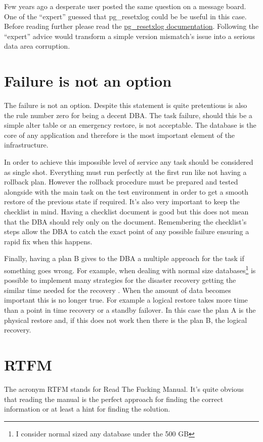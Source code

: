 Few years ago a desperate user posted the same question on a message board. One of the ``expert'' 
guessed that pg\_resetxlog could be be useful in this case. Before reading further please read the 
\href{http://www.postgresql.org/docs/9.3/static/app-pgresetxlog.html}{pg\_resetxlog documentation}. 
Following the ``expert'' advice would transform a simple version mismatch's issue into a serious 
data area corruption. 

\section{Failure is not an option}
The failure is not an option. Despite this statement is quite pretentious is also the rule number 
zero for being a decent DBA. The task failure, should this be a simple alter table or an emergency 
restore, is not acceptable. The database is the core of any application and therefore is the most important 
element of the infrastructure.\newline

In order to achieve this impossible level of service any task should be considered as single shot. 
Everything must run perfectly at the first run like not having a rollback plan. However the rollback 
procedure must be prepared and tested alongside with the main task on the test environment in order to get a 
smooth restore of the previous state if required. It's also very important to keep the checklist in mind. 
Having a checklist document is good but this does not mean that the DBA should rely only on the 
document. Remembering the checklist's steps allow the DBA to catch the exact point of any possible failure 
ensuring a rapid fix when this happens.\newline

Finally, having a plan B gives to the DBA a multiple approach for the task if something goes wrong. For 
example, when dealing with normal size databases\footnote{I consider normal sized any database under the 500 
GB} is possible to implement many strategies for the disaster recovery getting the similar time needed for 
the recovery . When the amount of data becomes important this is no longer true. For example a logical 
restore takes more time than a point in time recovery or a standby failover. In this case the plan A is the 
physical restore and, if this does not work then there is the plan B, the logical recovery.

\section{RTFM}
The acronym RTFM stands for Read The Fucking Manual. It's quite obvious that reading the manual is the 
perfect approach for finding the correct information or at least a hint for finding the solution.\newline

